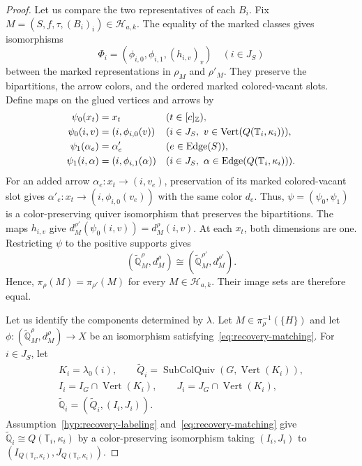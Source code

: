 \begin{proof}
 Let us compare the two representatives of each $B_i$.
Fix $M=(S,f,\tau,(B_i)_i)\in\mathcal H_{a,k}$.
The equality of the marked classes gives isomorphisms
\[
 \Phi_i=(\phi_{i,0},\phi_{i,1},(h_{i,v})_v)
 \quad(i\in J_S)
\]
between the marked representations in $\rho_M$ and $\rho'_M$.
They preserve the bipartitions, the arrow colors, and the ordered marked colored-vacant slots.
Define maps on the glued vertices and arrows by
\[
\begin{aligned}
 \psi_0(x_t)&=x_t &&(t\in[c]_{\Z}),\\
 \psi_0(i,v)&=(i,\phi_{i,0}(v)) &&(i\in J_S,\ v\in\operatorname{Vert}(Q(\mathbb T_i,\kappa_i))),\\
 \psi_1(\alpha_e)&=\alpha'_e &&(e\in\operatorname{Edge}(S)),\\
 \psi_1(i,\alpha)&=(i,\phi_{i,1}(\alpha)) &&(i\in J_S,\ \alpha\in\operatorname{Edge}(Q(\mathbb T_i,\kappa_i))).
\end{aligned}
\]
For an added arrow $\alpha_e:x_t\to(i,v_e)$, preservation of its marked colored-vacant slot gives
$\alpha'_e:x_t\to(i,\phi_{i,0}(v_e))$ with the same color $d_e$.
Thus, $\psi=(\psi_0,\psi_1)$ is a color-preserving quiver isomorphism that preserves the bipartitions.
The maps $h_{i,v}$ give
$d_M^{\rho'}(\psi_0(i,v))=d_M^\rho(i,v)$.
At each $x_t$, both dimensions are one.
Restricting $\psi$ to the positive supports gives
\[
 (\widetilde{\mathbb Q}_M^\rho,d_M^\rho)
 \cong(\widetilde{\mathbb Q}_M^{\rho'},d_M^{\rho'}).
\]
Hence, $\pi_\rho(M)=\pi_{\rho'}(M)$ for every $M\in\mathcal H_{a,k}$.
Their image sets are therefore equal.

 Let us identify the components determined by $\lambda$.
Let $M\in\pi_\rho^{-1}(\{H\})$ and let $\phi:(\widetilde{\mathbb Q}_M^\rho,d_M^\rho)\to X$ be an isomorphism satisfying~\eqref{eq:recovery-matching}.
For $i\in J_{S}$, let
\[
\begin{gathered}
 K_i=\lambda_0(i),\qquad
 \widetilde Q_i=\operatorname{SubColQuiv}(G,\operatorname{Vert}(K_i)),\\
 I_i=I_G\cap\operatorname{Vert}(K_i),\qquad
 J_i=J_G\cap\operatorname{Vert}(K_i),\\
 \widetilde{\mathbb Q}_i=(\widetilde Q_i,(I_i,J_i)).
\end{gathered}
\]
Assumption~\ref{hyp:recovery-labeling} and~\eqref{eq:recovery-matching} give
$\widetilde{\mathbb Q}_i\cong Q(\mathbb T_i,\kappa_i)$ by a color-preserving isomorphism taking $(I_i,J_i)$ to $(I_{Q(\mathbb T_i,\kappa_i)},J_{Q(\mathbb T_i,\kappa_i)})$.


\end{proof}
